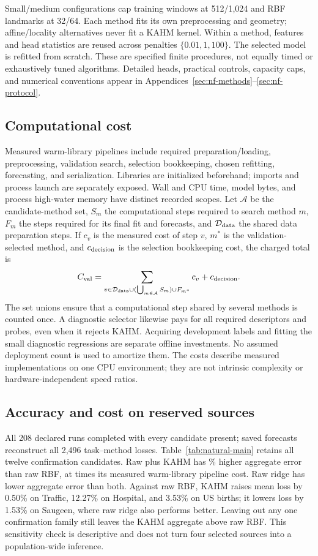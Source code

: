 Small/medium configurations cap training windows at 512/1,024 and RBF
landmarks at 32/64. Each method fits its own preprocessing and geometry;
affine/locality alternatives never fit a KAHM kernel. Within a method,
features and head statistics are reused across penalties $\{0.01,1,100\}$.
The selected model is refitted from scratch. These are specified finite
procedures, not equally timed or exhaustively tuned algorithms. Detailed
heads, practical controls, capacity caps, and numerical conventions appear
in Appendices~\ref{sec:nf-methods}--\ref{sec:nf-protocol}.

\subsection{Computational cost}
Measured warm-library pipelines include required preparation/loading,
preprocessing, validation search, selection bookkeeping, chosen refitting,
forecasting, and serialization. Libraries are initialized beforehand;
imports and process launch are separately exposed. Wall and CPU time,
model bytes, and process high-water memory have distinct recorded scopes.
Let $\mathcal A$ be the candidate-method set, $S_m$ the computational
steps required to search method $m$, $F_m$ the steps required for its
final fit and forecasts, and $\mathcal D_{\rm data}$ the shared data
preparation steps. If $c_v$ is the measured cost of step $v$, $m^*$ is
the validation-selected method, and $c_{\rm decision}$ is the selection
bookkeeping cost, the charged total is
\begin{equation}\label{eq:main-cost}
 C_{\rm val}=\sum_{v\in\mathcal D_{\rm data}\cup
             (\bigcup_{m\in\mathcal A}S_m)\cup F_{m^*}}c_v
             +c_{\rm decision}.
\end{equation}
The set unions ensure that a computational step shared by several
methods is counted once. A diagnostic selector likewise
pays for all required descriptors and probes, even when it rejects KAHM.
Acquiring development labels and fitting the small diagnostic regressions
are separate offline investments. No assumed deployment count is used to
amortize them. The costs describe measured implementations on one CPU
environment; they are not intrinsic complexity or hardware-independent
speed ratios.

\subsection{Accuracy and cost on reserved sources}
All 208 declared runs completed with every candidate present; saved
forecasts reconstruct all 2,496 task--method losses. Table~\ref{tab:natural-main}
retains all twelve confirmation candidates. Raw plus KAHM has
\NaturalErrorIncrease\% higher aggregate error than raw RBF, at
\NaturalCostRatio{} times its measured warm-library pipeline cost. Raw
ridge has lower aggregate error than both. Against raw RBF, KAHM raises
mean loss by 0.50\% on Traffic, 12.27\% on Hospital, and 3.53\% on US births;
it lowers loss by 1.53\% on Saugeen, where raw ridge also performs better.
Leaving out any one confirmation family still leaves the KAHM aggregate
above raw RBF. This sensitivity check is descriptive and does not turn
four selected sources into a population-wide inference.

